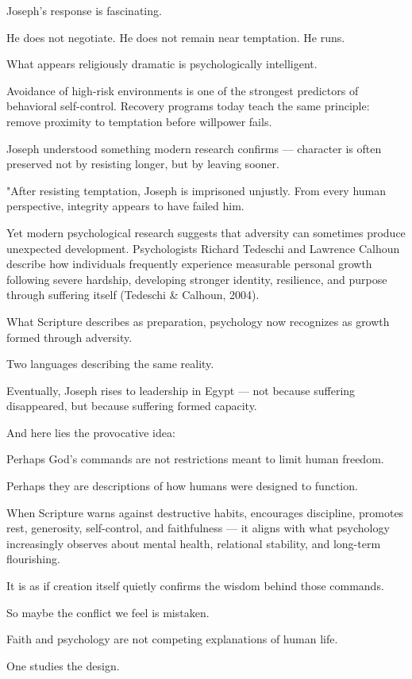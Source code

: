 \documentclass[12pt]{article}
\begin{document}
Joseph’s response is fascinating.

He does not negotiate.
He does not remain near temptation.
He runs.

What appears religiously dramatic is psychologically intelligent.

Avoidance of high-risk environments is one of the strongest predictors of behavioral self-control. Recovery programs today teach the same principle: remove proximity to temptation before willpower fails.

Joseph understood something modern research confirms — character is often preserved not by resisting longer, but by leaving sooner.

"After resisting temptation, Joseph is imprisoned unjustly. From every human perspective, integrity appears to have failed him.

Yet modern psychological research suggests that adversity can sometimes produce unexpected development. Psychologists Richard Tedeschi and Lawrence Calhoun describe how individuals frequently experience measurable personal growth following severe hardship, developing stronger identity, resilience, and purpose through suffering itself (Tedeschi & Calhoun, 2004).

What Scripture describes as preparation, psychology now recognizes as growth formed through adversity.

Two languages describing the same reality.

Eventually, Joseph rises to leadership in Egypt — not because suffering disappeared, but because suffering formed capacity.

And here lies the provocative idea:

Perhaps God’s commands are not restrictions meant to limit human freedom.

Perhaps they are descriptions of how humans were designed to function.

When Scripture warns against destructive habits, encourages discipline, promotes rest, generosity, self-control, and faithfulness — it aligns with what psychology increasingly observes about mental health, relational stability, and long-term flourishing.

It is as if creation itself quietly confirms the wisdom behind those commands.

So maybe the conflict we feel is mistaken.

Faith and psychology are not competing explanations of human life.

One studies the design.
\end{document}
